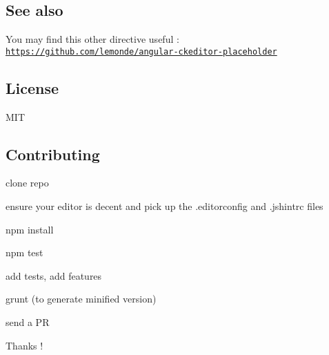 \subsection*{See also}

You may find this other directive useful \+: \href{https://github.com/lemonde/angular-ckeditor-placeholder}{\tt https\+://github.\+com/lemonde/angular-\/ckeditor-\/placeholder}

\subsection*{License}

M\+IT

\subsection*{Contributing}


\begin{DoxyItemize}
\item clone repo
\item ensure your editor is decent and pick up the {\ttfamily .editorconfig} and {\ttfamily .jshintrc} files
\item {\ttfamily npm install}
\item {\ttfamily npm test}
\item add tests, add features
\item {\ttfamily grunt} (to generate minified version)
\item send a PR
\end{DoxyItemize}

Thanks ! 